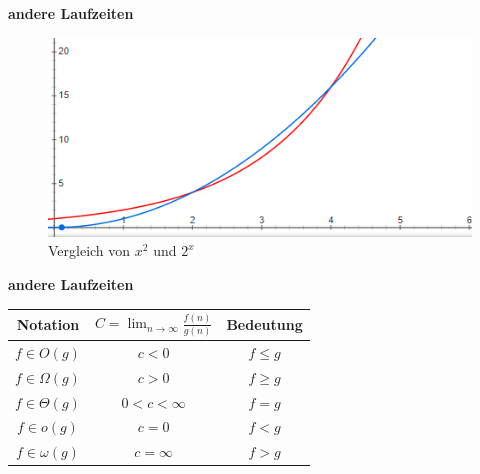 \documentclass[12pt,a4paper]{article}
\begin{document}
\textbf{andere Laufzeiten}\\
\begin{figure}[H]
\includegraphics[scale=0.6]{resources/exp_vs_poly.png}
\caption{Vergleich von $x^2$ und $2^x$}
\label{fig}
\end{figure}
\textbf{andere Laufzeiten}\\
\hfill

\begin{tabular}{|c|c|c|}
\hline
Notation & $ C = \lim_{n\rightarrow \infty} \frac{f(n)}{g(n)}$ & Bedeutung \\
\hline
$f \in O(g)$ & $c < 0$ & $f\leq g$\\
\hline
$f \in \Omega(g)$ & $c >0$ & $f\geq g$\\
\hline
$f \in \Theta(g)$ & $0<c<\infty$ & $f=g$\\
\hline
$f \in o(g)$ & $c=0$ & $f<g$\\
\hline
$f \in \omega(g)$ & $c=\infty$ & $f>g$\\
\hline
\end{tabular}
\end{document}
